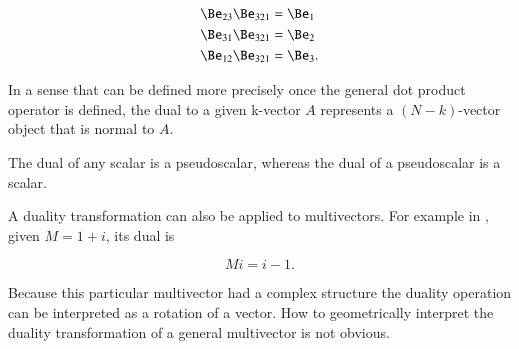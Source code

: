 \begin{dmath}\label{eqn:definitions:400}
\begin{aligned}
\Be_{23} \Be_{321} &= \Be_1 \\
\Be_{31} \Be_{321} &= \Be_2 \\
\Be_{12} \Be_{321} &= \Be_3.
\end{aligned}
\end{dmath}

In a sense that can be defined more precisely once the general dot product operator is defined, the dual to a given k-vector \( A \) represents a \((N-k)\)-vector object that is normal to \( A \).

The dual of any scalar is a pseudoscalar, whereas the dual of a pseudoscalar is a scalar.

A duality transformation can also be applied to multivectors.
For example in , given \( M = 1 + i\), its dual is

\begin{dmath}\label{eqn:dual:460}
M i = i - 1.
\end{dmath}

Because this particular multivector had a complex structure the duality operation can be interpreted as a rotation of a vector.
How to geometrically interpret the duality transformation of a general multivector is not obvious.

